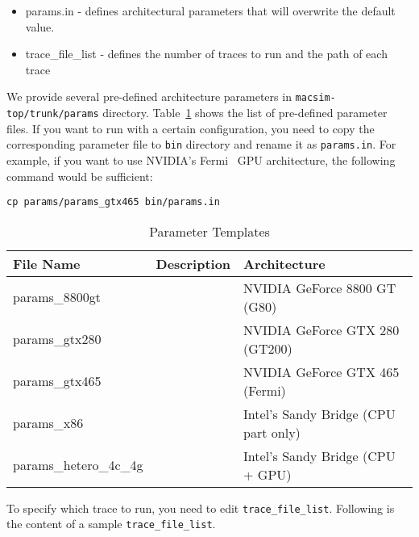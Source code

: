\begin{itemize}
  \item params.in - defines architectural parameters that will
  overwrite the default value.

  \item trace\_file\_list - defines the number of traces to run and
  the path of each trace
\end{itemize}


We provide several pre-defined architecture parameters in
\Verb+macsim-top/trunk/params+ directory. Table~\ref{table:param}
shows the list of pre-defined parameter files. If you want to run \SIM
with a certain configuration, you need to copy the corresponding
parameter file to \Verb+bin+ directory and rename it as
\Verb+params.in+. For example, if you want to use NVIDIA's
Fermi~\cite{fermi} GPU architecture, the following command would be
sufficient:

\begin{Verbatim}
cp params/params_gtx465 bin/params.in
\end{Verbatim}


\begin{table}
\begin{footnotesize}
\begin{center}
\caption{Parameter Templates}
\label{table:param}
\begin{tabular}{|l|l|l|}
\hline
File Name              & Description & Architecture                         \\ \hline \hline
params\_8800gt         &             & NVIDIA GeForce 8800 GT (G80)         \\
params\_gtx280         &             & NVIDIA GeForce GTX 280 (GT200)       \\
params\_gtx465         &             & NVIDIA GeForce GTX 465 (Fermi)       \\
params\_x86            &             & Intel's Sandy Bridge (CPU part only) \\
params\_hetero\_4c\_4g &             & Intel's Sandy Bridge (CPU + GPU)     \\ \hline
\end{tabular}
\end{center}
\end{footnotesize}
\end{table}


To specify which trace to run, you need to edit
\Verb+trace_file_list+. Following is the content of a sample
\Verb+trace_file_list+.


